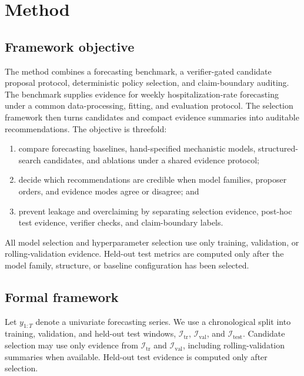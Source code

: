 \section{Method}

\subsection{Framework objective}

The method combines a forecasting benchmark, a verifier-gated candidate
proposal protocol, deterministic policy selection, and claim-boundary auditing.
The benchmark supplies evidence for weekly hospitalization-rate forecasting
under a common data-processing, fitting, and evaluation protocol. The
selection framework then turns candidates and compact evidence summaries into
auditable recommendations. The objective is threefold:
\begin{enumerate}[leftmargin=1.5em]
\item compare forecasting baselines, hand-specified mechanistic models,
structured-search candidates, and ablations under a shared evidence protocol;
\item decide which recommendations are credible when model families, proposer
orders, and evidence modes agree or disagree; and
\item prevent leakage and overclaiming by separating selection evidence,
post-hoc test evidence, verifier checks, and claim-boundary labels.
\end{enumerate}

All model selection and hyperparameter selection use only training,
validation, or rolling-validation evidence. Held-out test metrics are computed
only after the model family, structure, or baseline configuration has been
selected.

\subsection{Formal framework}

Let $y_{1:T}$ denote a univariate forecasting series. We use a chronological
split into training, validation, and held-out test windows,
$\mathcal{I}_{\mathrm{tr}}$, $\mathcal{I}_{\mathrm{val}}$, and
$\mathcal{I}_{\mathrm{test}}$. Candidate selection may use only evidence from
$\mathcal{I}_{\mathrm{tr}}$ and $\mathcal{I}_{\mathrm{val}}$, including
rolling-validation summaries when available. Held-out test evidence is
computed only after selection.

